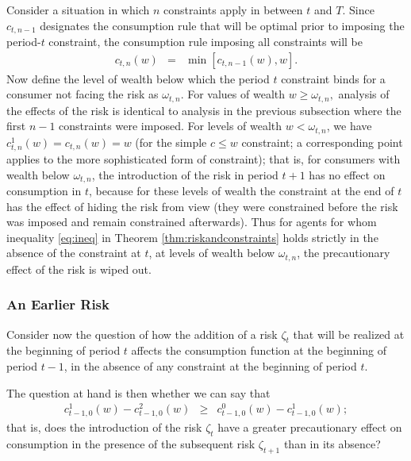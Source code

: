 \documentclass[titlepage]{\econtex}
\providecommand{\wAlt}{\omega}
\begin{document}
  Consider a situation in which $n$ constraints apply in between $t$ and $T$. Since $c_{t,n-1}$ designates the consumption rule that will be optimal prior to imposing the period-$t$ constraint, the consumption rule imposing all constraints will be
  \begin{eqnarray}
    c_{t,n}(w) & = & \min[c_{t,n-1}(w),w].
  \end{eqnarray}
  Now define the level of wealth below which the period $t$ constraint binds for a consumer not facing the risk as ${\wAlt}_{t,n}.$ For values of wealth $w \geq {\wAlt}_{t,n},$ analysis of the effects of the risk is identical to analysis in the previous subsection where the first $n-1$ constraints were imposed. For levels of wealth $w < {\wAlt}_{t,n}$, we have $c^{1}_{t,n}(w) = c_{t,n}(w)=w$ (for the simple $c \leq w$
  constraint; a corresponding point applies to the more sophisticated form of constraint); that is, for consumers with wealth below ${\wAlt}_{t,n}$, the introduction of the risk in period $t+1$ has no effect on consumption in $t$, because for these levels of wealth the constraint at the end of $t$ has the effect of hiding the risk from view (they were constrained before the risk was imposed and remain constrained afterwards). Thus for agents for whom inequality \eqref{eq:ineq} in Theorem \ref{thm:riskandconstraints} holds strictly in the absence of the constraint at $t$, at levels of wealth below ${\wAlt}_{t,n}$, the precautionary effect of the risk is wiped out.

  \subsubsection{An Earlier Risk}\label{subsubsec:AnEarlierRisk}

  Consider now the question of how the addition of a risk $\zeta_{t}$ that will be realized at the beginning of period $t$ affects the consumption function at the beginning of period $t-1$, in the absence of any constraint at the beginning of period $t$.

  The question at hand is then whether we can say that
  \begin{eqnarray}
    \label{eq:earlierrisk}
    c_{t-1,0}^{1}(w)-c_{t-1,0}^{2}(w) & \geq & c_{t-1,0}^0(w)-c^{1}_{t-1,0}(w);
  \end{eqnarray}
  that is, does the introduction of the risk $\zeta_{t}$ have a greater precautionary effect on consumption in the presence of the subsequent risk $\zeta_{t+1}$ than in its absence?
\end{document}
